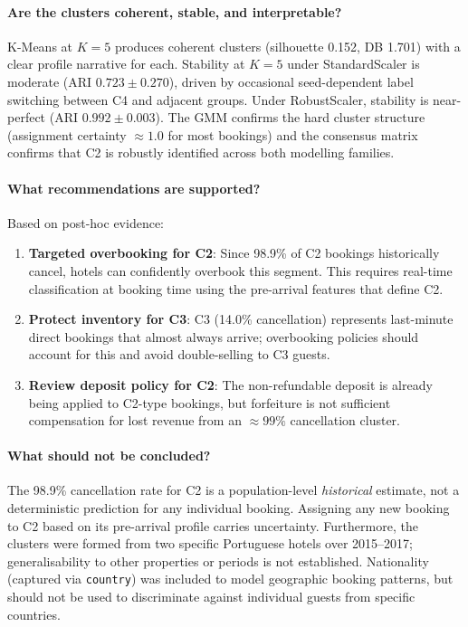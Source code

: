 \documentclass[12pt,a4paper]{article}
\begin{document}
\paragraph{Are the clusters coherent, stable, and interpretable?}
K-Means at $K=5$ produces coherent clusters (silhouette 0.152, DB 1.701)
with a clear profile narrative for each.
Stability at $K=5$ under StandardScaler is moderate (ARI $0.723 \pm 0.270$),
driven by occasional seed-dependent label switching between C4 and adjacent
groups. Under RobustScaler, stability is near-perfect (ARI $0.992 \pm 0.003$).
The GMM confirms the hard cluster structure (assignment certainty $\approx 1.0$
for most bookings) and the consensus matrix confirms that C2 is robustly
identified across both modelling families.

\paragraph{What recommendations are supported?}
Based on post-hoc evidence:
\begin{enumerate}[noitemsep]
  \item \textbf{Targeted overbooking for C2}: Since 98.9\% of C2 bookings
        historically cancel, hotels can confidently overbook this segment.
        This requires real-time classification at booking time using the
        pre-arrival features that define C2.
  \item \textbf{Protect inventory for C3}: C3 (14.0\% cancellation) represents
        last-minute direct bookings that almost always arrive; overbooking
        policies should account for this and avoid double-selling to C3 guests.
  \item \textbf{Review deposit policy for C2}: The non-refundable deposit is
        already being applied to C2-type bookings, but forfeiture is not
        sufficient compensation for lost revenue from an $\approx 99\%$
        cancellation cluster.
\end{enumerate}

\paragraph{What should not be concluded?}
The 98.9\% cancellation rate for C2 is a population-level \emph{historical}
estimate, not a deterministic prediction for any individual booking.
Assigning any new booking to C2 based on its pre-arrival profile carries
uncertainty.
Furthermore, the clusters were formed from two specific Portuguese hotels
over 2015--2017; generalisability to other properties or periods is not
established.
Nationality (captured via \texttt{country}) was included to model
geographic booking patterns, but should not be used to discriminate
against individual guests from specific countries.
\end{document}
